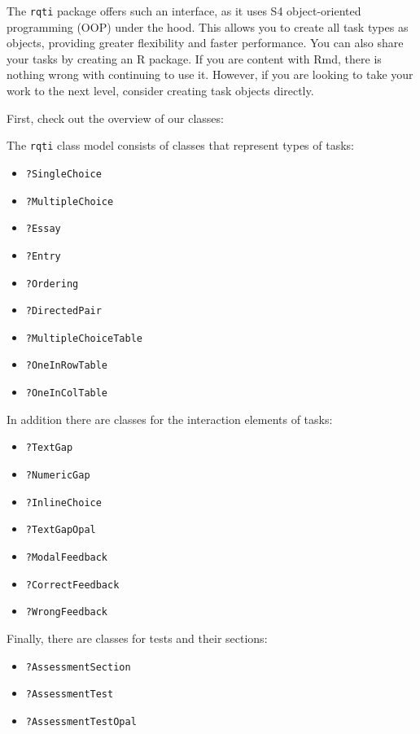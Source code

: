 \documentclass[twoside]{tufte-book}
\providecommand{\tightlist}{%
  \setlength{\itemsep}{0pt}\setlength{\parskip}{0pt}}
\begin{document}
The \texttt{rqti} package offers such an interface, as it uses S4 object-oriented programming (OOP) under the hood. This allows you to create all task types as objects, providing greater flexibility and faster performance. You can also share your tasks by creating an R package. If you are content with Rmd, there is nothing wrong with continuing to use it. However, if you are looking to take your work to the next level, consider creating task objects directly.

First, check out the overview of our classes:

The \texttt{rqti} class model consists of classes that represent types of tasks:

\begin{itemize}
\tightlist
\item
  \texttt{?SingleChoice}
\item
  \texttt{?MultipleChoice}
\item
  \texttt{?Essay}
\item
  \texttt{?Entry}
\item
  \texttt{?Ordering}
\item
  \texttt{?DirectedPair}
\item
  \texttt{?MultipleChoiceTable}
\item
  \texttt{?OneInRowTable}
\item
  \texttt{?OneInColTable}
\end{itemize}

In addition there are classes for the interaction elements of tasks:

\begin{itemize}
\tightlist
\item
  \texttt{?TextGap}
\item
  \texttt{?NumericGap}
\item
  \texttt{?InlineChoice}
\item
  \texttt{?TextGapOpal}
\item
  \texttt{?ModalFeedback}
\item
  \texttt{?CorrectFeedback}
\item
  \texttt{?WrongFeedback}
\end{itemize}

Finally, there are classes for tests and their sections:

\begin{itemize}
\tightlist
\item
  \texttt{?AssessmentSection}
\item
  \texttt{?AssessmentTest}
\item
  \texttt{?AssessmentTestOpal}
\end{itemize}
\end{document}
